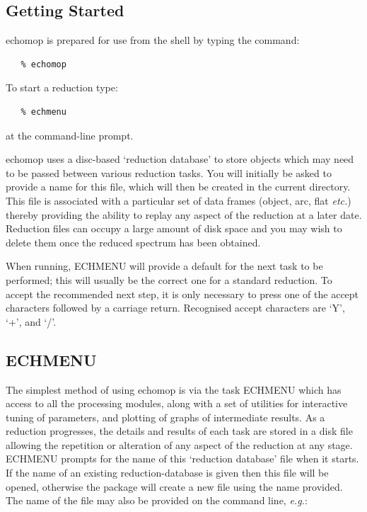 \documentclass[11pt,twoside]{article}
\newcommand{\xlabel}[1]{}
\newcommand{\mlabel}[1]{\xlabel{#1}\label{#1}}
\newcommand{\myindex}[1]{\index{#1}}
\renewcommand{\myindex}[1]{}
\begin{document}
\subsection{\mlabel{getting_started}Getting Started}
\myindex{Monolith}

{\sc echomop} is prepared for use from the shell by typing the command:

\begin{verbatim}
   % echomop
\end{verbatim}

To start a reduction type:

\begin{verbatim}
   % echmenu
\end{verbatim}

at the command-line prompt.

{\sc echomop} uses a disc-based `reduction database' to store objects which may need
to be passed between various reduction tasks.\myindex{Reduction database}
You will initially be asked to provide a name for this file, which will then
be created in the current directory.
This file is associated with a particular set of data frames
(object, arc, flat {\it etc.}) thereby providing the ability to
replay any aspect of the reduction at a later date.
Reduction files can occupy a large amount of disk space and you may wish to
delete them once the reduced spectrum has been obtained.

When running, ECHMENU will provide a default for the next task to be
performed; this will usually be the correct one for a standard reduction.
To accept the recommended next step, it is only necessary to press one of the
accept characters followed by a carriage return.  Recognised accept characters
are `Y', `+', and `/'. \myindex{Accept character}

\subsection{\mlabel{ECHMENU}ECHMENU}

The simplest method of using {\sc echomop} is via the task ECHMENU which has
access to all the processing modules, along with a set of utilities for
interactive tuning of parameters, and plotting of graphs of intermediate
results.  As a reduction progresses, the details and results of each task
are stored in a disk file allowing the repetition or alteration of any aspect
of the reduction at any stage. \myindex{Reduction database} ECHMENU
prompts for the name of this `reduction database' file when it
starts.  If the name of an existing reduction-database is given then
this file will be opened, otherwise the package will create a new file
using the name provided.  The name of the file may also be provided on the
command line, {\it{e.g.}}:
\end{document}
